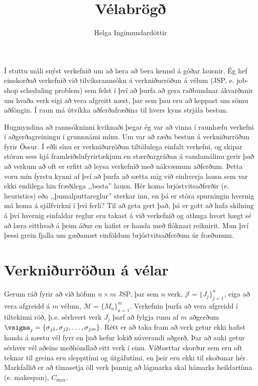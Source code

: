 \documentclass[10pt,a4paper]{article}
\title{Vélabrögð} %
\author{Helga Ingimundardóttir}
\begin{document}
\maketitle


Í stuttu máli snýst verkefnið um að læra að bera kennsl á góðar lausnir. 
Ég hef einskorðað verkefnið við tilviksrannsókn á verkniðurröðun á vélum (JSP, 
e. job-shop scheduling problem) 
sem felst í því að þurfa að gera raðbundnar ákvarðanir um hvaða verk eigi 
að vera afgreitt næst, þar sem þau eru að keppast um sömu aðföngin.
Í raun má útvíkka aðferðafræðina til hvers kyns strjála bestun. 

Hugmyndina að rannsókninni kviknaði þegar ég var að vinna í raunhæfu verkefni í 
aðgerðagreiningu í grunnnámi mínu. Um var að ræða bestun á verkniðurröðun fyrir 
Össur. Í eðli sínu er verkniðurröðun tiltölulega einfalt verkefni, og skipar 
stóran sess hjá framleiðslufyrirtækjum en stærðargráðan á vandamálinu gerir það 
að verkum að oft er erfitt að leysa verkefnið með nákvæmum aðferðum. 
Þetta voru mín fyrstu kynni af því að þurfa að sætta mig við einhverja lausn 
sem var ekki endilega hin fræðilega ,,besta'' lausn. 
Hér koma brjóstvitsaðferðir (e. heuristics) eða ,,þumalputtareglur'' sterkar 
inn, en þá er stóra spurningin hvernig má koma á sjálfvirkni í því ferli? 
Til að geta gert það, þá er gott að hafa skilning á því hvernig einfaldar 
reglur eru takast á við verkefnið og athuga hvort hægt sé að læra eitthvað á 
þeim áður en hafist er handa með flóknari reiknirit. 
Mun því þessi grein fjalla um gæðamæt einföldum brjóstvitsaðferðum úr fræðunum. 

\section*{Verkniðurröðun á vélar}
Gerum ráð fyrir að við höfum $n\times m$ JSP, 
þar sem $n$ verk, $\mathcal{J}=\{J_j\}_{j=1}^n$, 
eiga að vera afgreidd á $m$ vélum, $\mathcal{M}=\{M_a\}_{a=1}^m$. 
Verkefnin þurfa að vera afgreidd í tiltekinni röð, þ.e. sérhvert verk $J_j$ 
þarf að fylgja runu af $m$ aðgerðum 
$\vsigma_j=\{\sigma_{j1},\sigma_{j2},\dotsc,\sigma_{jm}\}$. 
Rétt er að taka fram að verk getur ekki hafist handa á næstu vél fyrr en það 
hefur lokið núverandi aðgerð. 
Þar að auki getur sérhver vél aðeins meðhöndlað eitt verk í einu. 
Viðbættar skorður sem eru oft teknar til greina eru sleppitími og útgáfutími, 
en þeir eru ekki til skoðunar hér.
Markfallið er að tímasetja öll verk þannig að lágmarka skal hámarks heildartíma 
(e. makespan), $C_{\max}$. 
\end{document}
